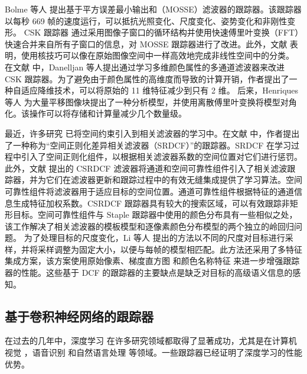 Bolme 等人 \cite{MOSSE} 提出基于平方误差最小输出和（MOSSE）滤波器的跟踪器。该跟踪器以每秒 669 帧的速度运行，可以抵抗光照变化、尺度变化、姿势变化和非刚性变形。
CSK 跟踪器 \cite{Henriques2012ExploitingTC} 通过采用图像子窗口的循环结构并使用快速傅里叶变换（FFT）快速合并来自所有子窗口的信息，对 MOSSE 跟踪器进行了改进。此外，文献 \cite{Henriques2012ExploitingTC} 表明，使用核技巧可以像在原始图像空间中一样高效地完成非线性空间中的分类。
在文献 \cite{Danelljan2014AdaptiveCA} 中，Danelljan 等人提出通过学习多维颜色属性的多通道滤波器来改进 CSK 跟踪器。为了避免由于颜色属性的高维度而导致的计算开销，作者提出了一种自适应降维技术，可以将原始的 11 维特征减少到只有 2 维。
后来，Henriques 等人 \cite{henriques2014high-speed} 为大量平移图像块提出了一种分析模型，并使用离散傅里叶变换将模型对角化。该操作可以将存储和计算量减少几个数量级。

最近，许多研究 \cite{Danelljan2015LearningSR, Lukezic2017DiscriminativeCF} 已将空间约束引入到相关滤波器的学习中。在文献 \cite{Danelljan2015LearningSR} 中，作者提出了一种称为“空间正则化差异相关滤波器（SRDCF）”的跟踪器。SRDCF 在学习过程中引入了空间正则化组件，以根据相关滤波器系数的空间位置对它们进行惩罚。
此外，文献 \cite{Lukezic2017DiscriminativeCF} 提出的 CSRDCF 滤波器将通道和空间可靠性组件引入了相关滤波跟踪器，并为它们在滤波器更新和跟踪过程中的有效无缝集成提供了学习算法。空间可靠性组件将滤波器用于适应目标的空间位置。通道可靠性组件根据特征的通道信息生成特征加权系数。CSRDCF 跟踪器具有较大的搜索区域，可以有效跟踪非矩形目标。空间可靠性组件与 Staple \cite{Bertinetto2016StapleC} 跟踪器中使用的颜色分布具有一些相似之处，该工作解决了相关滤波器的模板模型和逐像素颜色分布模型的两个独立的岭回归问题。
为了处理目标的尺度变化，Li 等人 \cite{Li2014ASA} 提出的方法以不同的尺度对目标进行采样，并将采样调整为固定大小，以便与每帧的模型相匹配。此方法还采用了多特征集成方案，该方案使用原始像素、梯度直方图 \cite{Forsyth2014ObjectDW} 和颜色名称特征 \cite{Weijer2009LearningCN} 来进一步增强跟踪器的性能。这些基于 DCF 的跟踪器的主要缺点是缺乏对目标的高级语义信息的感知。

\subsection{基于卷积神经网络的跟踪器}
在过去的几年中，深度学习 \cite{Goodfellow2015DeepL} 在许多研究领域都取得了显著成功，尤其是在计算机视觉 \cite{Matiz2019InductiveCP, Zhu2019RotatedCR, Xiao2019DenseSE}，语音识别 \cite{Kim2016JointCB, Liu2019AttentionGD} 和自然语言处理 \cite{Vinyals2014GrammarAA, Yousfi2017ContributionOR} 等领域。一些跟踪器已经证明了深度学习的性能优势。


